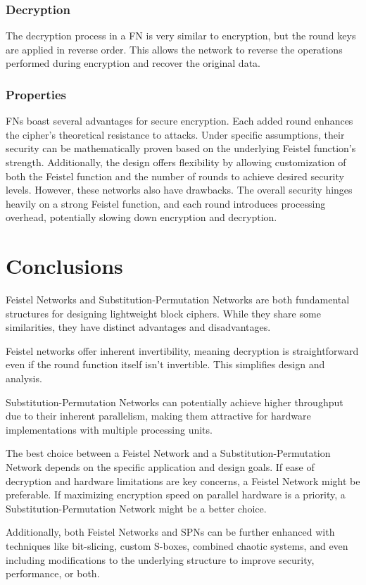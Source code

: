 \documentclass[conference]{IEEEtran}
\begin{document}
\subsubsection{Decryption}
The decryption process in a FN is very similar to encryption, but the round keys are applied in reverse order. This allows the network to reverse the operations performed during encryption and recover the original data.
\subsubsection{Properties}
FNs boast several advantages for secure encryption. Each added round enhances the cipher's theoretical resistance to attacks. Under specific assumptions, their security can be mathematically proven based on the underlying Feistel function's strength. Additionally, the design offers flexibility by allowing customization of both the Feistel function and the number of rounds to achieve desired security levels. However, these networks also have drawbacks. The overall security hinges heavily on a strong Feistel function, and each round introduces processing overhead, potentially slowing down encryption and decryption.


\section{Conclusions}
Feistel Networks and Substitution-Permutation Networks are both fundamental structures for designing lightweight block ciphers. While they share some similarities, they have distinct advantages and disadvantages.

Feistel networks offer inherent invertibility, meaning decryption is straightforward even if the round function itself isn't invertible. This simplifies design and analysis.

Substitution-Permutation Networks can potentially achieve higher throughput due to their inherent parallelism, making them attractive for hardware implementations with multiple processing units.

The best choice between a Feistel Network and a Substitution-Permutation Network depends on the specific application and design goals. If ease of decryption and hardware limitations are key concerns, a Feistel Network might be preferable. If maximizing encryption speed on parallel hardware is a priority, a Substitution-Permutation Network might be a better choice.

Additionally, both Feistel Networks and SPNs can be further enhanced with techniques like bit-slicing, custom S-boxes, combined chaotic systems, and even including modifications to the underlying structure to improve security, performance, or both.
\end{document}
